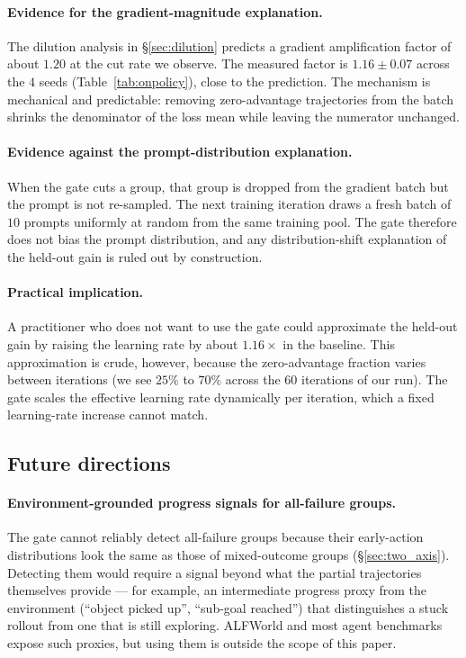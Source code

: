 \documentclass{article}
\begin{document}
\paragraph{Evidence for the gradient-magnitude explanation.}
The dilution analysis in \S\ref{sec:dilution} predicts a gradient
amplification factor of about $1.20$ at the cut rate we observe.
The measured factor is $1.16 \pm 0.07$ across the $4$ seeds
(Table~\ref{tab:onpolicy}), close to the prediction. The
mechanism is mechanical and predictable: removing zero-advantage
trajectories from the batch shrinks the denominator of the loss
mean while leaving the numerator unchanged.

\paragraph{Evidence against the prompt-distribution explanation.}
When the gate cuts a group, that group is dropped from the
gradient batch but the prompt is not re-sampled. The next training
iteration draws a fresh batch of $10$ prompts uniformly at random
from the same training pool. The gate therefore does not bias the
prompt distribution, and any distribution-shift explanation of the
held-out gain is ruled out by construction.

\paragraph{Practical implication.}
A practitioner who does not want to use the gate could approximate
the held-out gain by raising the learning rate by about $1.16\times$
in the baseline. This approximation is crude, however, because the
zero-advantage fraction varies between iterations (we see $25\%$ to
$70\%$ across the $60$ iterations of our run). The gate scales the
effective learning rate dynamically per iteration, which a fixed
learning-rate increase cannot match.

\subsection{Future directions}

\paragraph{Environment-grounded progress signals for all-failure
groups.}
The gate cannot reliably detect all-failure groups because their
early-action distributions look the same as those of mixed-outcome
groups (\S\ref{sec:two_axis}). Detecting them would require a
signal beyond what the partial trajectories themselves provide ---
for example, an intermediate progress proxy from the environment
(``object picked up'', ``sub-goal reached'') that distinguishes a
stuck rollout from one that is still exploring. ALFWorld and most
agent benchmarks expose such proxies, but using them is outside
the scope of this paper.
\end{document}

